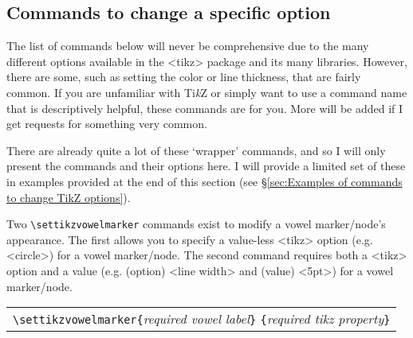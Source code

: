\documentclass{article}
\newcommand{\pkg}[1]{\texttt{#1}}
\newcommand{\TikZ}{Ti\textit{k}Z\xspace}
\def\\{}%
\def\texttt#1{<#1>}%
\begin{document}
\subsection{Commands to change a specific option}
\label{sec:Commands to change a specific option}

The list of commands below will never be comprehensive due to the many different options available in the \pkg{tikz} package and its many libraries.  However, there are some, such as setting the color or line thickness, that are fairly common.  If you are unfamiliar with \TikZ or simply want to use a command name that is descriptively helpful, these commands are for you.  More will be added if I get requests for something very common.

There are already quite a lot of these `wrapper' commands, and so I will only present the commands and their options here.  I will provide a limited set of these in examples provided at the end of this section (see \S \ref{sec:Examples of commands to change TikZ options}).

\bigskip
\noindent
Two \verb|\settikzvowelmarker| commands exist to modify a vowel marker/node's appearance.  The first allows you to specify a value-less \pkg{tikz} option (e.g. \texttt{circle}) for a vowel marker/node.  The second command requires both a \pkg{tikz} option and a value (e.g. (option) \texttt{line width} and (value) \texttt{5pt}) for a vowel marker/node.
\begin{center}
	\begin{tabular}{l}
		\begin{minipage}[t]{0.85\textwidth}
			{\small
				\verb|\settikzvowelmarker{|\textit{required vowel label}\verb|}|\\
				\hspace*{10.5em}\verb|{|\textit{required tikz property}\verb|}|
			}
		\end{minipage} \\
	\end{tabular}
\end{center}
\end{document}
